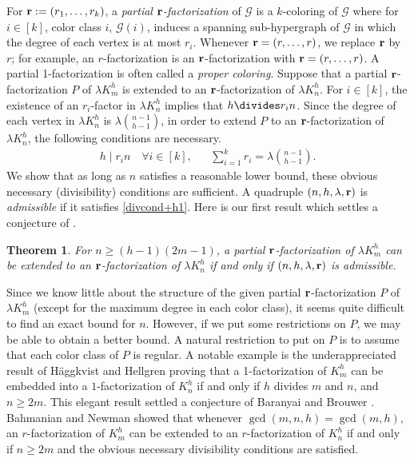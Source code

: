 \documentclass[12pt,oneside]{amsart}
\newtheorem{theorem}{Theorem}[section]
\newcommand{\cc}{\mathcal}
\begin{document}
For $\vb r:=(r_1,\dots,r_k)$, a {\it partial $\vb r$-factorization} of $\cc G$ is a $k$-coloring of $\cc G$ where for $i\in [k]$, color class  $i$, $\cc G(i)$,  induces a spanning sub-hypergraph of $\cc G$ in which the degree of each vertex is at most $r_i$. Whenever  $\vb r=(r,\dots,r)$, we replace $\vb r$ by $r$; for example, an $r$-factorization  is an  $\vb r$-factorization with $\vb r=(r,\dots,r)$. A partial 1-factorization is often called a {\it proper coloring}. 
Suppose that a partial $\vb r$-factorization $P$ of $\lambda K_m^h$ is extended to an $\vb r$-factorization of $\lambda K_n^h$. For $i\in[k]$, the existence of an $r_i$-factor in $\lambda K_n^h$ implies that $h \divides r_in$. Since the degree of each vertex in $\lambda K_n^h$ is $\lambda \binom{n-1}{h-1}$, in order to extend $P$ to an $\vb r$-factorization of $\lambda K_n^h$, the following conditions are necessary.
\begin{align} \label{divcond+h1}
    &&
    h \mid r_i n \quad \forall i\in[k],
    &&
    \sum_{i=1}^k r_i = \lambda\binom{n-1}{h-1}.
    &&
  \end{align} 
We  show that as long as $n$ satisfies a reasonable lower bound, these obvious necessary (divisibility) conditions are  sufficient.  A quadruple $(n,h,\lambda, \vb r)$ is {\it admissible} if it satisfies  \eqref{divcond+h1}.  Here is our first result which settles a conjecture of \cite{MR3915188}.
\begin{theorem}\label{thm:general}
 For $n \geq (h-1)(2m-1)$, a partial $\vb r$-factorization of $\lambda K_m^h$ can be extended to an $\vb r$-factorization of $\lambda K_n^h$ if and only if  $(n,h,\lambda, \vb r)$ is admissible. 
\end{theorem}
Since we know little about the structure of the given partial $\vb r$-factorization $P$ of $\lambda K_m^h$ (except for the maximum degree in each color class), it seems quite difficult to find an exact bound for $n$. However, if we put some restrictions on $P$, we may be able to obtain a better bound. A natural restriction to put on $P$ is to assume that  each color class of $P$ is regular. A notable example is the underappreciated  result of H\"{a}ggkvist and Hellgren \cite{MR1249714} proving that a 1-factorization of $K_m^h$ can be embedded into a $1$-factorization of $K_n^h$ if and only if $h$ divides $m$ and $n$, and $n\geq 2m$. This elegant result settled a conjecture of Baranyai and Brouwer \cite{BaranBrouwer77}. Bahmanian and Newman \cite{MR3910877} showed that whenever $\gcd (m,n,h)=\gcd (m,h)$,  an $r$-factorization of $K_m^h$ can be extended to an $r$-factorization of $K_n^h$ if and only if  $n\geq 2m$ and the obvious necessary divisibility conditions are satisfied.  
\end{document}
